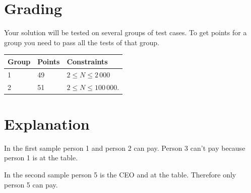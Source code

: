 \section*{Grading}
Your solution will be tested on several groups of test cases. To get points for a group you need to pass all the tests of that group.

\begin{tabular}{| l | l | l |}
	\hline
	Group & Points & Constraints \\ \hline
  1     & 49         & $2 \le N \le 2\,000$ \\ \hline
  2     & 51         & $2 \le N \le 100\,000$. \\ \hline
\end{tabular}

\section*{Explanation}
In the first sample person 1 and person 2 can pay. Person 3 can't pay because person 1 is at the table.

In the second sample person 5 is the CEO and at the table. Therefore only person 5 can pay.

